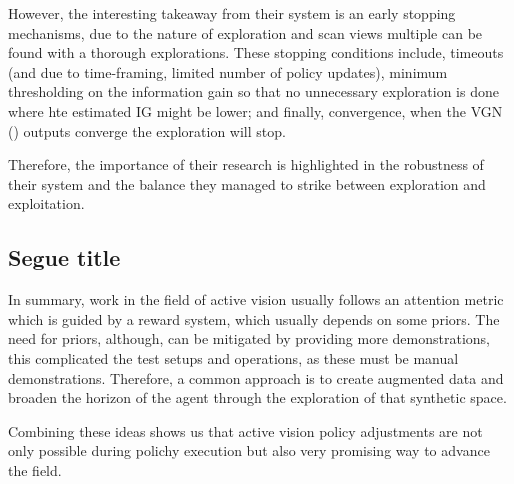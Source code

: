 However, the interesting takeaway from their system is an early stopping mechanisms, due to the nature of exploration and scan views multiple can be found with a thorough explorations. These stopping conditions include, timeouts (and due to time-framing, limited number of policy updates), minimum thresholding on the information gain so that no unnecessary exploration is done where  hte estimated IG might be lower; and finally, convergence, when the VGN () outputs converge the exploration will stop. 


Therefore, the importance of their research is highlighted in the robustness of their system and the balance they managed to strike between exploration and exploitation. 


\subsection{Segue title}
In summary, work in the field of active vision usually follows an attention metric which is guided by a reward system, which usually depends on some priors. The need for priors, although, can be mitigated by providing more demonstrations, this complicated the test setups and operations, as these must be manual demonstrations. Therefore, a common approach is to create augmented data and broaden the horizon of the agent through the exploration of that synthetic space.

Combining these ideas shows us that active vision policy adjustments are not only possible during polichy execution but also very promising way to advance the field.
